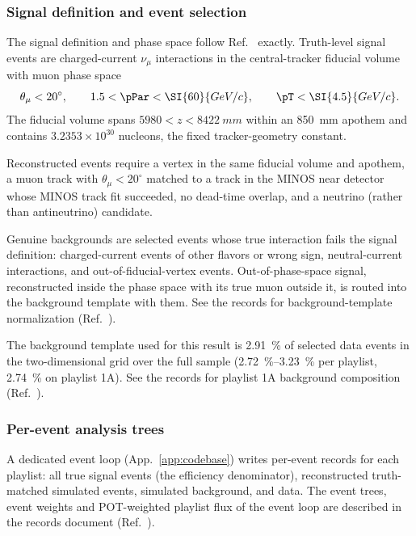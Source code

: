 \subsubsection{Signal definition and event selection}
\label{sec:selection}
The signal definition and phase space follow Ref.~\cite{MINERvA:2021owq} exactly. Truth-level signal events are charged-current $\nu_\mu$ interactions in the central-tracker fiducial volume with muon phase space
\begin{equation*}
  \theta_\mu < 20^{\circ},\qquad
  1.5 < \pPar < \SI{60}{GeV/c},\qquad
  \pT < \SI{4.5}{GeV/c}.
\end{equation*}
The fiducial volume spans $5980 < z < \SI{8422}{mm}$ within an \SI{850}{mm} apothem and contains $3.2353\times10^{30}$ nucleons, the fixed tracker-geometry constant.

Reconstructed events require a vertex in the same fiducial volume and apothem, a muon track with $\theta_\mu<20^{\circ}$ matched to a track in the MINOS near detector whose MINOS track fit succeeded, no dead-time overlap, and a neutrino (rather than antineutrino) candidate.

Genuine backgrounds are selected events whose true interaction fails the signal definition: charged-current events of other flavors or wrong sign, neutral-current interactions, and out-of-fiducial-vertex events. Out-of-phase-space signal, reconstructed inside the phase space with its true muon outside it, is routed into the background template with them. See the records for background-template normalization (Ref.~\cite{NoteRecords2026}).

The background template used for this result is \SI{2.91}{\percent} of selected data events in the two-dimensional grid over the full sample (\SIrange{2.72}{3.23}{\percent} per playlist, \SI{2.74}{\percent} on playlist 1A). See the records for playlist 1A background composition (Ref.~\cite{NoteRecords2026}).



\subsubsection{Per-event analysis trees}
\label{sec:evloop}
A dedicated event loop (App.~\ref{app:codebase}) writes per-event records for each playlist: all true signal events (the efficiency denominator), reconstructed truth-matched simulated events, simulated background, and data. The event trees, event weights and POT-weighted playlist flux of the event loop are described in the records document (Ref.~\cite{NoteRecords2026}).


